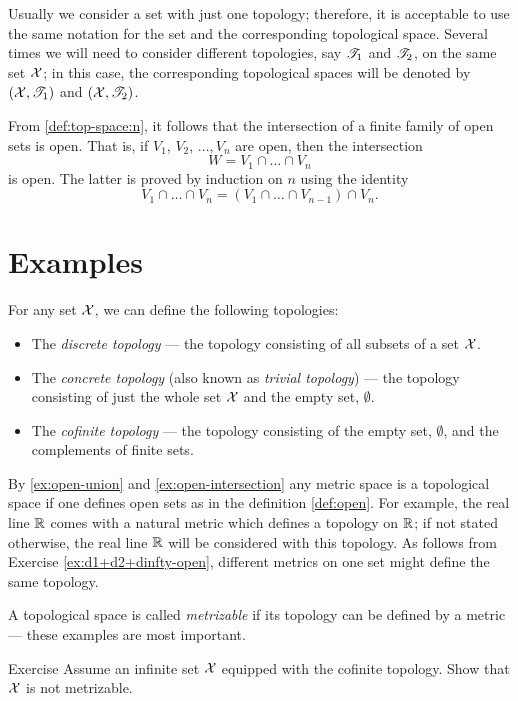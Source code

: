 Usually we consider a set with just one topology;
therefore, it is acceptable to use the same notation for the set and the corresponding topological space.
Several times we will need to consider different topologies, say $\mathscr{T}_1$ and $\mathscr{T}_2$, on the same set $\mathcal{X}$;
in this case, the corresponding topological spaces will be denoted by $(\mathcal{X},\mathscr{T}_1)$ and $(\mathcal{X},\mathscr{T}_2)$.


From \ref{def:top-space:n}, it follows that the intersection of a finite family of open sets is open.
That is, if $V_1$, $V_2$, $\ldots, V_n$ are open, then the intersection
\[W=V_1 \cap \ldots\cap V_n\] is open.
The latter is proved by induction on $n$ using the identity
\[V_1 \cap \dots\cap V_n=(V_1 \cap \dots \cap V_{n-1})\cap V_n.\]

\section{Examples}\label{sec:ecamples(top)}

For any set $\mathcal{X}$, we can define the following topologies:
\begin{itemize} 
\item  The \emph{discrete topology} --- the topology consisting of all subsets of a set $\mathcal{X}$.
\item  The \emph{concrete topology} (also known as \emph{trivial topology}) --- the topology consisting of just the whole set $\mathcal{X}$ and the empty set, $\emptyset$.
\item  The \emph{cofinite topology} --- the topology consisting of the empty set, $\emptyset$, and the complements of finite sets.
\end{itemize}

By \ref{ex:open-union} and \ref{ex:open-intersection} any metric space is a topological space if one defines open sets as in the definition \ref{def:open}.
For example, the real line $\mathbb{R}$ comes with a natural metric which defines a topology on $\mathbb{R}$;
if not stated otherwise, the real line $\mathbb{R}$ will be considered with this topology.
As follows from Exercise \ref{ex:d1+d2+dinfty-open},
different metrics on one set might define the same topology.

A topological space is called \emph{metrizable} if its topology can be defined by a metric --- these examples are most important.

\begin{thm}{Exercise}\label{ex:cofinite-metrizable}
Assume an infinite set $\mathcal{X}$ equipped with the cofinite topology.
Show that $\mathcal{X}$ is not metrizable.
\end{thm}

